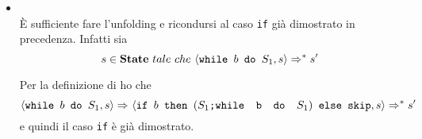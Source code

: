 {\begin{itemize}
\begin{itemize}
		Sia 
		\[ y\notin\lvar{\ifABC{b}{$S_1$}{$S_2$}} \]
		allora, per definizione di 
		\texttt{lvar}, 
		\[ y\notin\lvar{$S_1$} \cup \lvar{$S_2$} \]
		 e quindi in
		particolare 
		$y\notin\lvar{$S_1$}$. Per \hi vale quindi
		$s(y)=s'(y)$.

		\item {}: è analogo al precedente. 
		Nel caso in cui la
		valutazione della guardia nello stato $s$ si falsa, allora 
	\[ \confSs{\ifABC{b}{S_1}{S_2}}{s}\Rar{}\confSs{S_2}{s} \]
		sul quale so che
		vale l'\hi{}, poichè per ipotesi 
		\[ \confSs{\ifABC{b}{S_1}{S_2}}{s}\Rar{*}s'\]
		 di conseguenza 
		 	\[ \exists~k\in 	\mathbb{N}~tale~che~\confSs{\ifABC{b}{S_1}{S_2}}{s}\Rar{k}s' \]
		 e quindi 
	\[ 	\confSs{\ifABC{b}{S_1}{S_2}}{s}\Rar{}\confSs{S_2}{s}\Rar{k-1}s' \].
		 
		Sia $y\notin\lvar{\ifABC{b}{$S_1$}{$S_2$}}$ allora, per definizione di 
		\texttt{lvar}, $y\notin\lvar{$S_1$} \cup \lvar{$S_2$}$ e quindi in
		particolare $y\notin\lvar{$S_2$}$. Per ipotesi induttiva vale quindi
		$s(y)=s'(y)$.
		\end{itemize}

	\item {}
	\casespace
	\\
	\`{E} sufficiente fare l'unfolding e
	ricondursi al caso \texttt{if} già dimostrato in precedenza. 
	Infatti sia 
\[ 	s\in\mbox{\textbf{State}}~tale~che~\langle{}\mbox{\normalfont{\texttt{while }}} b \textrm{\normalfont{\texttt{ do }}} S_1, s\rangle{}\Rightarrow^{*}s' \]
	
	Per la definizione
	di \whileSOS{} ho che 
\[ 	\langle{}\mbox{\normalfont{\texttt{while }}} b \textrm{\normalfont{\texttt{ do }}} S_1, s\rangle{}\Rightarrow^{}
	\langle{}\mbox{\normalfont{\texttt{if }}} b \textrm{\normalfont{\texttt{ then }}} (\textrm{\normalfont{\texttt{$S_1$;\mbox{\normalfont{\texttt{while }}} b \textrm{\normalfont{\texttt{ do }}} $S_1$}}}) \textrm{\normalfont{\texttt{ else }}} \textrm{\normalfont{\texttt{skip}}}, s\rangle{}\Rightarrow^{*}s' \]
	e quindi il caso \texttt{if} è già dimostrato.
	\end{itemize}


}

\newpage